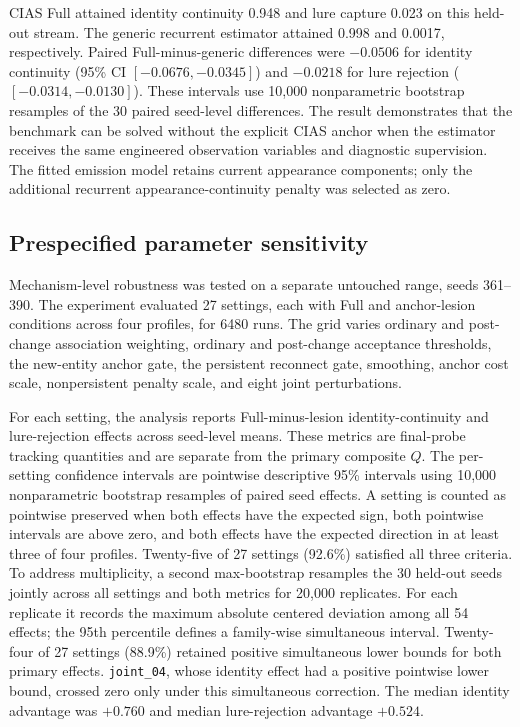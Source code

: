 \documentclass[10pt,journal,onecolumn]{IEEEtran}
\begin{document}
CIAS Full attained identity continuity 0.948 and lure capture 0.023 on this held-out stream. The generic recurrent estimator attained 0.998 and 0.0017, respectively. Paired Full-minus-generic differences were $-0.0506$ for identity continuity (95\% CI $[-0.0676,-0.0345]$) and $-0.0218$ for lure rejection ($[-0.0314,-0.0130]$). These intervals use 10,000 nonparametric bootstrap resamples of the 30 paired seed-level differences. The result demonstrates that the benchmark can be solved without the explicit CIAS anchor when the estimator receives the same engineered observation variables and diagnostic supervision. The fitted emission model retains current appearance components; only the additional recurrent appearance-continuity penalty was selected as zero.

\subsection{Prespecified parameter sensitivity}
Mechanism-level robustness was tested on a separate untouched range, seeds 361--390. The experiment evaluated 27 settings, each with Full and anchor-lesion conditions across four profiles, for 6480 runs. The grid varies ordinary and post-change association weighting, ordinary and post-change acceptance thresholds, the new-entity anchor gate, the persistent reconnect gate, smoothing, anchor cost scale, nonpersistent penalty scale, and eight joint perturbations.

For each setting, the analysis reports Full-minus-lesion identity-continuity and lure-rejection effects across seed-level means. These metrics are final-probe tracking quantities and are separate from the primary composite $Q$. The per-setting confidence intervals are pointwise descriptive 95\% intervals using 10,000 nonparametric bootstrap resamples of paired seed effects. A setting is counted as pointwise preserved when both effects have the expected sign, both pointwise intervals are above zero, and both effects have the expected direction in at least three of four profiles. Twenty-five of 27 settings (92.6\%) satisfied all three criteria. To address multiplicity, a second max-bootstrap resamples the 30 held-out seeds jointly across all settings and both metrics for 20,000 replicates. For each replicate it records the maximum absolute centered deviation among all 54 effects; the 95th percentile defines a family-wise simultaneous interval. Twenty-four of 27 settings (88.9\%) retained positive simultaneous lower bounds for both primary effects. \texttt{joint\_04}, whose identity effect had a positive pointwise lower bound, crossed zero only under this simultaneous correction. The median identity advantage was $+0.760$ and median lure-rejection advantage $+0.524$.
\end{document}
